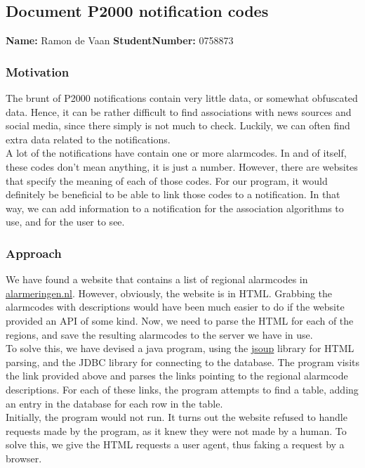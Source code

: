 \subsection{Document P2000 notification codes}
\textbf{Name:} Ramon de Vaan \indent \textbf{StudentNumber:} 0758873

\subsubsection*{Motivation}
The brunt of P2000 notifications contain very little data, or somewhat obfuscated data.
Hence, it can be rather difficult to find associations with news sources and social media, since there simply is not much to check.
Luckily, we can often find extra data related to the notifications. \\
A lot of the notifications have contain one or more alarmcodes.
In and of itself, these codes don't mean anything, it is just a number.
However, there are websites that specify the meaning of each of those codes.
For our program, it would definitely be beneficial to be able to link those codes to a notification.
In that way, we can add information to a notification for the association algorithms to use, and for the user to see.

\subsubsection*{Approach}
We have found a website that contains a list of regional alarmcodes in \href{https://www.alarmeringen.nl/alarmcodes.html}{alarmeringen.nl}.
However, obviously, the website is in HTML. 
Grabbing the alarmcodes with descriptions would have been much easier to do if the website provided an API of some kind. 
Now, we need to parse the HTML for each of the regions, and save the resulting alarmcodes to the server we have in use. \\
To solve this, we have devised a java program, using the \href{http://jsoup.org/}{jsoup} library for HTML parsing, and the JDBC library for connecting to the database.
The program visits the link provided above and parses the links pointing to the regional alarmcode descriptions.
For each of these links, the program attempts to find a table, adding an entry in the database for each row in the table. \\

Initially, the program would not run.
It turns out the website refused to handle requests made by the program, as it knew they were not made by a human.
To solve this, we give the HTML requests a user agent, thus faking a request by a browser. \\

